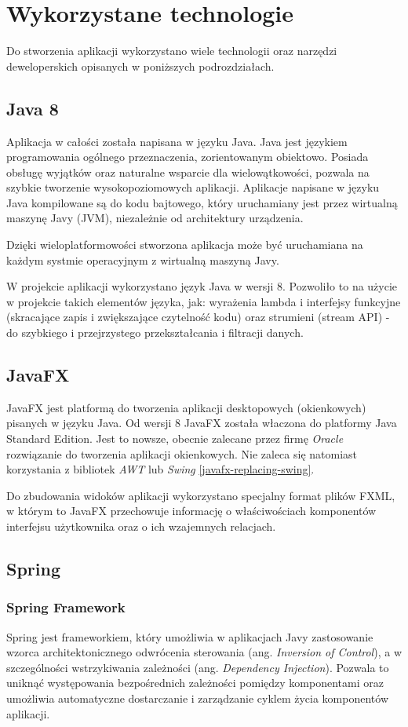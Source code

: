 \section{Wykorzystane technologie}
Do stworzenia aplikacji wykorzystano wiele technologii oraz narzędzi deweloperskich opisanych w poniższych podrozdziałach.

\subsection{Java 8}
Aplikacja w całości została napisana w języku Java.
Java jest językiem programowania ogólnego przeznaczenia, zorientowanym obiektowo. Posiada obsługę wyjątków oraz naturalne wsparcie dla wielowątkowości, pozwala na szybkie tworzenie wysokopoziomowych aplikacji. Aplikacje napisane w języku Java kompilowane są do kodu bajtowego, który uruchamiany jest przez wirtualną maszynę Javy (JVM), niezależnie od architektury urządzenia.

Dzięki wieloplatformowości stworzona aplikacja może być uruchamiana na każdym systmie operacyjnym z wirtualną maszyną Javy.

W projekcie aplikacji wykorzystano język Java w wersji 8. 
Pozwoliło to na użycie w projekcie takich elementów języka, jak: wyrażenia lambda i interfejsy funkcyjne (skracające zapis i zwiększające czytelność kodu) oraz strumieni (stream API) - do szybkiego i przejrzystego przekształcania i filtracji danych.

\subsection{JavaFX}
JavaFX jest platformą do tworzenia aplikacji desktopowych (okienkowych) pisanych w języku Java.
Od wersji 8 JavaFX została właczona do platformy Java Standard Edition.
Jest to nowsze, obecnie zalecane przez firmę {\it Oracle} rozwiązanie do tworzenia aplikacji okienkowych. Nie zaleca się natomiast korzystania z bibliotek {\it AWT} lub {\it Swing} \ref{javafx-replacing-swing}.

Do zbudowania widoków aplikacji wykorzystano specjalny format plików FXML, w którym to JavaFX przechowuje informację o właściwościach komponentów interfejsu użytkownika oraz o ich wzajemnych relacjach.

\subsection{Spring}
\subsubsection{Spring Framework}
Spring jest frameworkiem, który umożliwia w aplikacjach Javy zastosowanie wzorca architektonicznego odwrócenia sterowania (ang. {\it Inversion of Control}), a w szczególności wstrzykiwania zależności (ang. {\it Dependency Injection}). Pozwala to uniknąć występowania bezpośrednich zależności pomiędzy komponentami oraz umożliwia automatyczne dostarczanie i zarządzanie cyklem życia komponentów aplikacji.

